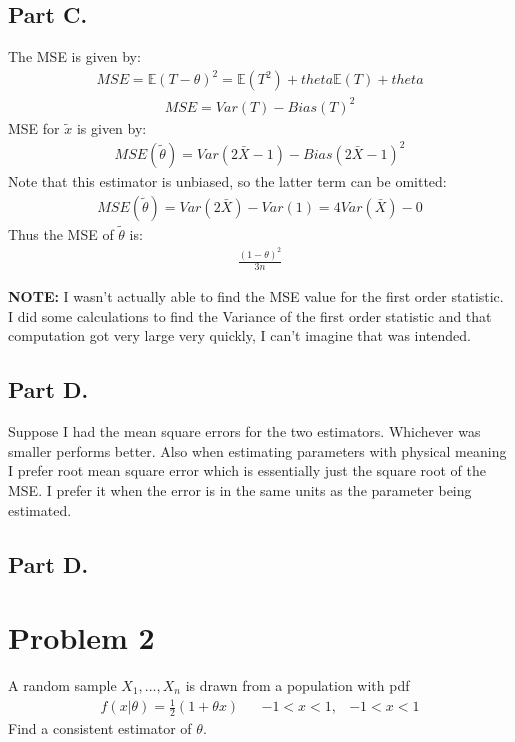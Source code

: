 \documentclass{article}
\begin{document}
\subsection*{Part C.}
The MSE is given by:
\begin{align*}
MSE = \mathbb{E}(T-\theta)^2 = \mathbb{E}(T^2) + theta \mathbb{E}(T) + theta
\end{align*}
\begin{align*}
MSE = Var(T) - Bias(T)^2
\end{align*}
MSE for $\tilde{x}$ is given by:
\begin{align*}
MSE( \tilde{\theta} ) = Var(2\bar{X}-1) - Bias(2\bar{X}-1)^2
\end{align*}
Note that this estimator is unbiased, so the latter term can be omitted:
\begin{align*}
MSE( \tilde{\theta} ) = Var(2\bar{X})-Var(1) = 4Var(\bar{X}) - 0 
\end{align*}
Thus the MSE of $\tilde{\theta}$ is:
\begin{align*}
\boxed{ \frac{(1-\theta)^2}{3 n}  }
\end{align*}

\textbf{NOTE:} I wasn't actually able to find the MSE value for the first order statistic. I did some calculations to find the Variance of the first order statistic and that computation got very large very quickly, I can't imagine that was intended.

\subsection*{Part D.}
Suppose I had the mean square errors for the two estimators. Whichever was smaller performs better. Also when estimating parameters with physical meaning I prefer root mean square error which is essentially just the square root of the MSE. I prefer it when the error is in the same units as the parameter being estimated.


\subsection*{Part D.}
\clearpage
\section*{Problem 2}
A random sample $X_1,...,X_n$ is drawn from a population with pdf
\begin{align*}
f(x|\theta) = \frac{1}{2} (1+\theta x) && -1 < x < 1, & -1 < x < 1
\end{align*}
Find a consistent estimator of $\theta$.
\end{document}

